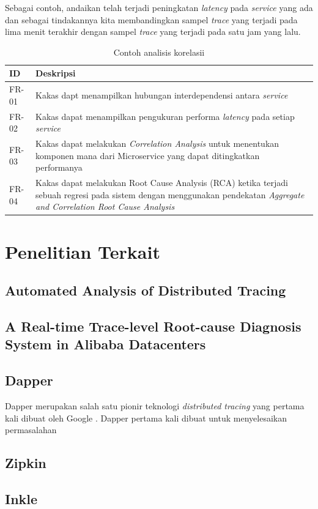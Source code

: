 Sebagai contoh, andaikan telah terjadi peningkatan \textit{latency} pada \textit{service} yang ada dan sebagai tindakannya kita membandingkan sampel \textit{trace} yang terjadi pada lima menit terakhir dengan sampel \textit{trace} yang terjadi pada satu jam yang lalu. 

\begin{small}
	\begin{longtable}{ | p{5cm} | p{5cm} | }
			\caption{Contoh analisis korelasii}
			\label{ch2-corr-table-1}                                                           \\ \hline
			\centering\bfseries{ID} & \centering\bfseries{Deskripsi} \tabularnewline \hline
			\endfirsthead
			FR-01 & Kakas dapt menampilkan hubungan interdependensi antara \textit{service} \\ \hline
			FR-02 & Kakas dapat menampilkan pengukuran performa \textit{latency} pada setiap \textit{service} \\ \hline
			FR-03 & Kakas dapat melakukan \textit{Correlation Analysis} untuk menentukan komponen mana dari Microservice yang dapat ditingkatkan performanya \\ \hline
			FR-04 & Kakas dapat melakukan Root Cause Analysis (RCA) ketika terjadi sebuah regresi pada sistem dengan menggunakan pendekatan \textit{Aggregate and Correlation Root Cause Analysis} \\ \hline
		\end{longtable}
\end{small}







\section{Penelitian Terkait}

\subsection{Automated Analysis of Distributed Tracing}

\subsection{A Real-time Trace-level Root-cause Diagnosis System in Alibaba Datacenters}


\subsection{Dapper}

Dapper merupakan salah satu pionir teknologi \textit{distributed tracing} yang pertama kali dibuat oleh Google \citep{dapper-paper}. Dapper pertama kali dibuat untuk menyelesaikan permasalahan 

\subsection{Zipkin}

\subsection{Inkle}

